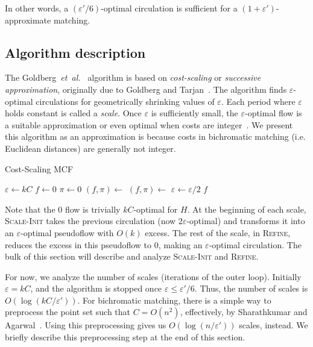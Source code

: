 \documentclass[11pt]{article}
\def\etal{\textsl{et~al.}}
\def\eps{\varepsilon}
\theoremstyle{plain}
\begin{document}
In other words, a $(\eps'/6)$-optimal circulation is sufficient for a 
$(1 + \eps')$-approximate matching.

\subsection{Algorithm description}

The Goldberg~{\etal}~\cite{GHKT17} algorithm is based on \emph{cost-scaling} or 
\emph{successive approximation}, originally due to Goldberg and 
Tarjan~\cite{GT90}.
The algorithm finds $\eps$-optimal circulations for geometrically shrinking 
values of $\eps$. 
Each period where $\eps$ holds constant is called a \emph{scale}.
Once $\eps$ is sufficiently small, the $\eps$-optimal flow is a suitable 
approximation or even optimal when costs are integer~\cite{GT90,GHKT17}.
We present this algorithm as an approximation is because costs in bichromatic 
matching (i.e. Euclidean distances) are generally not integer.

\begin{algorithm}
\caption{Cost-Scaling MCF}
\begin{algorithmic}[1]
\Function{MCF}{$H$, $\eps'$}
	\State $\eps \gets kC$
	\State $f \gets 0$
	\State $\pi \gets 0$
	\Repeat
		\State $(f, \pi) \gets$ 
		\State $(f, \pi) \gets$ 
		\State $\eps \gets \eps/2$
	\Until{$\eps \leq \eps'/6$}
	\State\Return $f$
\EndFunction
\end{algorithmic}
\end{algorithm}

Note that the 0 flow is trivially $kC$-optimal for $H$.
At the beginning of each scale, \textsc{Scale-Init} takes the previous 
circulation (now $2\eps$-optimal) and transforms it into an $\eps$-optimal 
pseudoflow with $O(k)$ excess.
The rest of the scale, in \textsc{Refine}, reduces the excess in this 
pseudoflow to 0, making an $\eps$-optimal circulation.
The bulk of this section will describe and analyze \textsc{Scale-Init} and 
\textsc{Refine}.

For now, we analyze the number of scales (iterations of the outer loop).
Initially $\eps = kC$, and the algorithm is stopped once $\eps \leq \eps'/6$.
Thus, the number of scales is $O(\log(kC/\eps'))$.
For bichromatic matching, there is a simple way to preprocess the point set 
such that $C = O(n^2)$, effectively, by Sharathkumar and Agarwal~\cite{SA12}.
Using this preprocessing gives us $O(\log(n/\eps'))$ scales, instead.
We briefly describe this preprocessing step at the end of this section.
\end{document}
